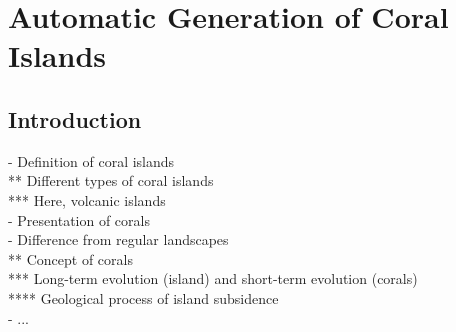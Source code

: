\chapter{Automatic Generation of Coral Islands}
\label{chap:coral-island}
\minitoc

\section{Introduction}
\label{sec:coral-island_introduction}
- Definition of coral islands \\
** Different types of coral islands \\
*** Here, volcanic islands \\
- Presentation of corals \\
- Difference from regular landscapes \\
** Concept of corals \\
*** Long-term evolution (island) and short-term evolution (corals) \\
**** Geological process of island subsidence \\
- ...

